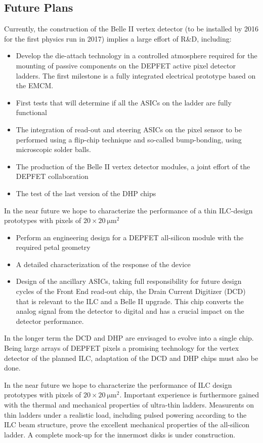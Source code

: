 \subsection{Future Plans}
Currently, the construction of the Belle II vertex detector (to be installed by 2016 for the first physics run in 2017) implies a large effort of R\&D, including:
\begin{itemize}
\item Develop the die-attach technology in a controlled atmosphere required for the mounting of passive components on the DEPFET active pixel detector ladders. The first milestone is a fully integrated electrical prototype based on the EMCM.
\item First tests that will determine if all the ASICs on the ladder are fully functional
\item The integration of read-out and steering ASICs on the pixel sensor to be performed using a flip-chip technique and so-called bump-bonding, using microscopic solder balls.
\item The production of the Belle II vertex detector modules, a joint effort of the DEPFET collaboration
\item The test of the last version of the DHP chips
\end{itemize}
In the near future we hope to characterize the performance of a thin ILC-design prototypes with pixels of $20 \times \SI{20}{\micro\meter^2}$
\begin{itemize}
\item Perform an engineering design for a DEPFET all-silicon module with the required petal geometry
\item A detailed characterization of the response of the device
\item Design of the ancillary ASICs, taking full responsibility for future design cycles of the Front End read-out chip, the Drain Current Digitizer (DCD) that is relevant to the ILC and a Belle II upgrade. This chip converts the analog signal from the detector to digital and has a crucial impact on the detector performance.
\end{itemize}

In the longer term the DCD and DHP are envisaged to evolve into a single chip. Being large arrays of DEPFET pixels a promising technology for the vertex detector of the planned ILC, adaptation of the DCD and DHP chips must also be done.

 In the near future we hope to characterize the performance of ILC design prototypes with pixels of $20 \times \SI{20}{\micro\meter^2}$.
Important experience is furthermore gained with the thermal and mechanical properties of ultra-thin ladders. Measurents on thin ladders under a realistic load, including pulsed powering according to the ILC beam structure, prove the excellent mechanical properties of the all-silicon ladder. A complete mock-up for the innermost disks is under construction.

